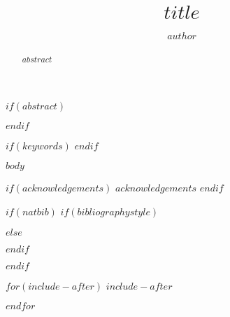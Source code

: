 \documentclass[times,$for(classoption)$$classoption$$sep$,$endfor$]{simauth}
\begin{document}

\title{$title$}
\author{$author$}
\address{$for(address)$ $address.address$\\$endfor$}

$if(abstract)$
\begin{abstract}
$abstract$
\end{abstract}
$endif$

$if(keywords)$
$endif$

\maketitle

$body$

$if(acknowledgements)$
\acks $acknowledgements$
$endif$

$if(natbib)$
$if(bibliographystyle)$

$else$

$endif$

$endif$

$for(include-after)$
$include-after$

$endfor$
\end{document}
